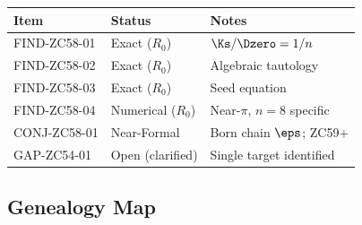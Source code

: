 \documentclass[12pt, a4paper]{article}
\begin{document}
\begin{center}
\begin{tabular}{@{}lp{4.5cm}p{4cm}@{}}
\toprule
\textbf{Item} & \textbf{Status} & \textbf{Notes} \\
\midrule
FIND-ZC58-01 & Exact ($R_0$) & $\Ks/\Dzero=1/n$ \\
FIND-ZC58-02 & Exact ($R_0$) & Algebraic tautology \\
FIND-ZC58-03 & Exact ($R_0$) & Seed equation \\
FIND-ZC58-04 & Numerical ($R_0$) & Near-$\pi$, $n=8$ specific \\
CONJ-ZC58-01 & Near-Formal & Born chain $\eps$; ZC59+ \\
\midrule
GAP-ZC54-01 & Open (clarified) & Single target identified \\
\bottomrule
\end{tabular}
\end{center}

\subsection{Genealogy Map}
\end{document}
